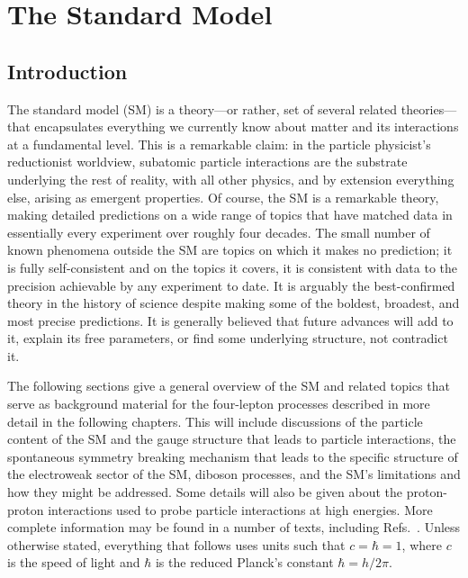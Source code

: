 
\chapter{The Standard Model}

\section{Introduction}

The standard model (SM) is a theory---or rather, set of several related theories---that encapsulates everything we currently know about matter and its interactions at a fundamental level.
This is a remarkable claim: in the particle physicist's reductionist worldview, subatomic particle interactions are the substrate underlying the rest of reality, with all other physics, and by extension everything else, arising as emergent properties.
Of course, the SM is a remarkable theory, making detailed predictions on a wide range of topics that have matched data in essentially every experiment over roughly four decades.
The small number of known phenomena outside the SM are topics on which it makes no prediction; it is fully self-consistent and on the topics it covers, it is consistent with data to the precision achievable by any experiment to date.
It is arguably the best-confirmed theory in the history of science despite making some of the boldest, broadest, and most precise predictions.
It is generally believed that future advances will add to it, explain its free parameters, or find some underlying structure, not contradict it.

The following sections give a general overview of the SM and related topics that serve as background material for the four-lepton processes described in more detail in the following chapters.
This will include discussions of the particle content of the SM and the gauge structure that leads to particle interactions, the spontaneous symmetry breaking mechanism that leads to the specific structure of the electroweak sector of the SM, diboson processes, and the SM's limitations and how they might be addressed.
Some details will also be given about the proton-proton interactions used to probe particle interactions at high energies.
More complete information may be found in a number of texts, including Refs.~\cite{Griffiths:111880,Halzen:1984mc,Peskin:1995ev,Donoghue:238727}.
Unless otherwise stated, everything that follows uses units such that $c = \hbar = 1$, where $c$ is the speed of light and $\hbar$ is the reduced Planck's constant $\hbar = h / 2\pi$.



